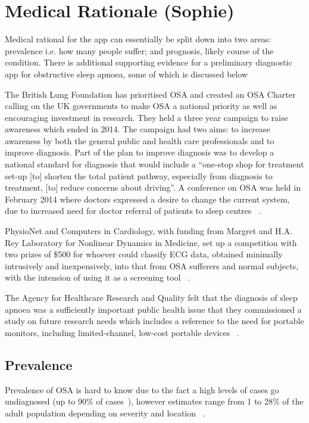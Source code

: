 \section{Medical Rationale (Sophie)}
\label{sec:medicalneed-sophie}
Medical rational for the app can essentially be split down into two areas: prevalence i.e. how many people suffer; and prognosis, likely course of the condition. There is additional supporting evidence for a preliminary diagnostic app for obstructive sleep apnoea, some of which is discussed below

The British Lung Foundation has prioritised OSA and created an OSA Charter calling on the UK governments to make OSA a national priority as well as encouraging investment in research. They held a three year campaign to raise awareness which ended in 2014. The campaign had two aims: to increase awareness by both the general public and health care professionals and to improve diagnosis. Part of the plan to improve diagnosis was to develop a national standard for diagnosis that would include a “one-stop shop for treatment set-up [to] shorten the total patient pathway, especially from diagnosis to treatment, [to] reduce concerns about driving”. A conference on OSA was held in February 2014 where doctors expressed a desire to change the current system, due to increased need for doctor referral of patients to sleep centres ~\cite{britishlungfoundation}.

PhysioNet and Computers in Cardiology, with funding from Margret and H.A. Rey Laboratory for Nonlinear Dynamics in Medicine, set up a competition with two prizes of \$500 for whoever could classify ECG data, obtained minimally intrusively and inexpensively, into that from OSA sufferers and normal subjects, with the intension of using it as a screening tool ~\cite{physionet}.

The Agency for Healthcare Research and Quality felt that the diagnosis of sleep apnoea was a sufficiently important public health issue that they commissioned a study on future research needs which includes a reference to the need for portable monitors, including limited-channel, low-cost portable devices ~\cite{balk2012future}.

\subsection{Prevalence}
Prevalence of OSA is hard to know due to the fact a high levels of cases go undiagnosed (up to 90\% of cases~\cite{finkel2009prevalence}), however estimates range from 1 to 28\% of the adult population depending on severity and location ~\cite{young2002epidemiology}.

